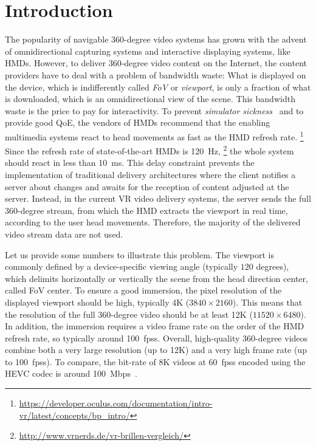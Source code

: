 \section{Introduction}
\label{sec:introduction}

The popularity of navigable 360-degree video systems has grown with
the advent of omnidirectional capturing systems
and interactive displaying systems, like \acp{HMD}. However, to
deliver 360-degree video content on the Internet, the content
providers have to deal with a problem of bandwidth waste: What is
displayed on the device, which is indifferently called
\textit{\ac{FoV}} or \textit{viewport}, is only a fraction of what is
downloaded, which is an omnidirectional view of the scene.
This bandwidth waste is the price to pay for interactivity. To prevent
\emph{simulator sickness}~\cite{moss2011characteristics} and to
provide good \ac{QoE}, the vendors of \acp{HMD} recommend that the
enabling multimedia systems react to head movements as fast as the
\ac{HMD} refresh rate.
\footnote{\url{https://developer.oculus.com/documentation/intro-vr/latest/concepts/bp_intro/}}
Since the refresh rate of state-of-the-art \acp{HMD} is
\SI{120}{\hertz},
\footnote{\url{http://www.vrnerds.de/vr-brillen-vergleich/}} the whole
system should react in less than \SI{10}{ms}. This delay constraint
prevents the implementation of traditional delivery architectures
where the client notifies a server about changes and awaits for the
reception of content adjusted at the server. Instead, in the current
\ac{VR} video delivery systems, the server sends the full 360-degree
stream, from which the \ac{HMD} extracts the viewport in real time,
according to the user head movements. Therefore, the majority of the
delivered video stream data are not used.

Let us provide some numbers to illustrate this problem. The viewport
is commonly defined by a device-specific viewing angle (typically
$120$ degrees), which delimits horizontally or vertically the scene
from the head direction center, called \ac{FoV} center. To ensure a
good immersion, the pixel resolution of the displayed viewport should
be high, typically 4K ($3840\times2160$). This means that the
resolution of the full 360-degree video should be at least 12K
($11520\times6480$). In addition, the immersion requires a video frame
rate on the order of the HMD refresh rate, so typically around
\SI[mode=text]{100}{\acp{fps}}. Overall, high-quality 360-degree
videos combine both a very large resolution (up to 12K) and a very
high frame rate (up to \SI[mode=text]{100}{\acp{fps}}). To compare,
the bit-rate of 8K videos at \SI[mode=text]{60}{\acp{fps}} encoded
using the \ac{HEVC} codec is around \SI{100}{Mbps}~\cite{7398367}.


